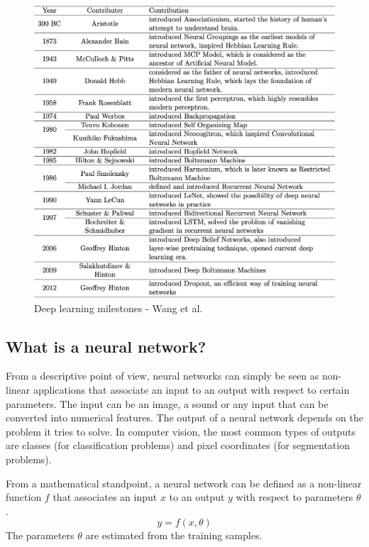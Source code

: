 \begin{figure}[!h]
\centering
\includegraphics[width=1\textwidth, keepaspectratio=true]{./figures/history.png}
\caption{Deep learning milestones - Wang et al. \cite{14}}
\label{history}
\end{figure}

 
\subsection{What is a neural network?}
\label{what_is_a_neural_network}
\setlength{\marginparwidth}{3cm}\leavevmode {}From a descriptive point of view, neural networks can simply be seen as non-linear applications that associate an input to an output with respect to certain parameters. The input can be an image, a sound or any input that can be converted into numerical features. The output of a neural network depends on the problem it tries to solve. In computer vision, the most common types of outputs are classes (for classification problems) and pixel coordinates (for segmentation problems).

\noindent From a mathematical standpoint, a neural network can be defined as a non-linear function $f$ that associates an input $x$ to an output $y$ with respect to parameters $\theta$.
\begin{equation}
y = f(x,\theta)
\end{equation}
The parameters $\theta$ are estimated from the training samples.

